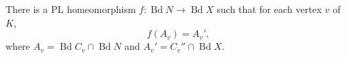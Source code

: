 There is a PL homeomorphism $f: \operatorname{Bd} N \to \operatorname{Bd} X$ such that for each vertex $v$ of $K$,
$$f(A_v) = A_v',$$
where $A_v = \operatorname{Bd} C_v \cap \operatorname{Bd} N$ and $A_v' = C_v'' \cap \operatorname{Bd} X$.
